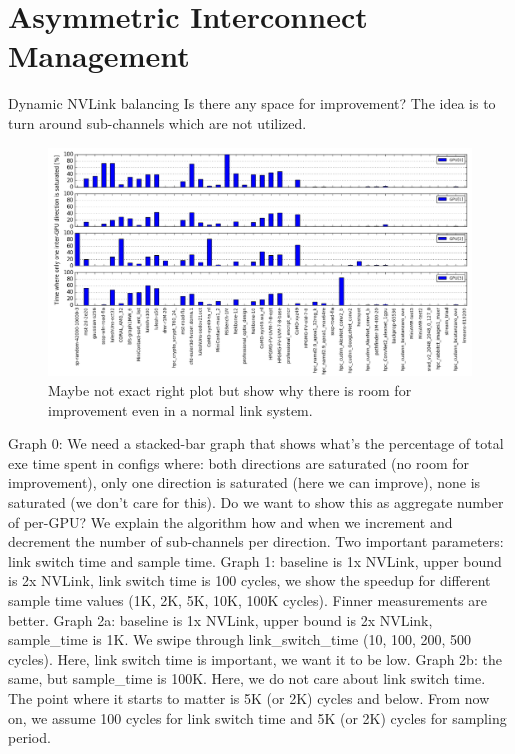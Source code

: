 \section{Asymmetric Interconnect Management}

Dynamic NVLink balancing Is there any space for improvement? The idea is to turn around sub-channels which are not utilized. 

\begin{figure}[tp]
    \centering
    \includegraphics[width=0.9\columnwidth]{figures/link-motivation.jpg}
    \caption{Maybe not exact right plot but show why there is room for improvement even in a normal link system.}
    \label{fig:link-motivation}
\end{figure}

Graph 0: We need a stacked-bar graph that shows what’s the percentage of total exe time spent in configs where: both directions are saturated (no room for improvement), only one direction is saturated (here we can improve), none is saturated (we don’t care for this). Do we want to show this as aggregate number of per-GPU?
We explain the algorithm how and when we increment and decrement the number of sub-channels per direction. Two important parameters: link switch time and sample time.
Graph 1: baseline is 1x NVLink, upper bound is 2x NVLink, link switch time is 100 cycles, we show the speedup for different sample time values (1K, 2K, 5K, 10K, 100K cycles). Finner measurements are better.
Graph 2a: baseline is 1x NVLink, upper bound is 2x NVLink, sample\_time is 1K. We swipe through link\_switch\_time (10, 100, 200, 500 cycles). Here, link switch time is important, we want it to be low.
Graph 2b: the same, but sample\_time is 100K. Here, we do not care about link switch time. The point where it starts to matter is 5K (or 2K) cycles and below. From now on, we assume 100 cycles for link switch time and 5K (or 2K) cycles for sampling period.


